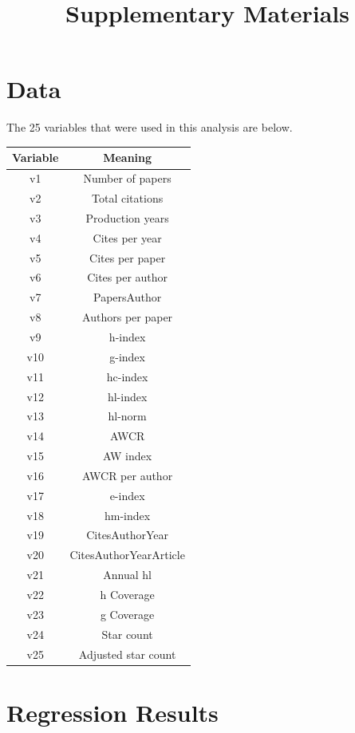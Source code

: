 \documentclass[12pt,a4paper]{article}
\title{Supplementary Materials}
\date{}
\begin{document}
\maketitle

\section{Data}
The 25 variables that were used in this analysis are below.

\begin{tabular}{|c|c|}
\hline 
\textbf{Variable} & \textbf{Meaning} \\ 
\hline 
v1 & Number of papers \\ 
\hline 
v2 & Total citations \\ 
\hline 
v3 & Production years \\ 
\hline 
v4 & Cites per year \\ 
\hline 
v5 & Cites per paper\\ 
\hline 
v6 & Cites per author\\ 
\hline 
v7 & PapersAuthor \\ 
\hline 
v8 & Authors per paper \\ 
\hline 
v9 & h-index \\ 
\hline 
v10 & g-index \\ 
\hline 
v11 & hc-index \\ 
\hline 
v12 & hl-index \\ 
\hline 
v13 & hl-norm \\ 
\hline 
v14 & AWCR \\ 
\hline 
v15 & AW index \\ 
\hline 
v16 & AWCR per author\\ 
\hline 
v17 & e-index \\ 
\hline 
v18 & hm-index \\ 
\hline 
v19 & CitesAuthorYear\\ 
\hline 
v20 & CitesAuthorYearArticle \\ 
\hline 
v21 & Annual hl \\ 
\hline 
v22 & h Coverage \\ 
\hline 
v23 & g Coverage \\ 
\hline 
v24 & Star count \\ 
\hline 
v25 & Adjusted star count \\ 
\hline 
\end{tabular}
\begingroup
{}
\endgroup

\section{Regression Results}
\end{document}
